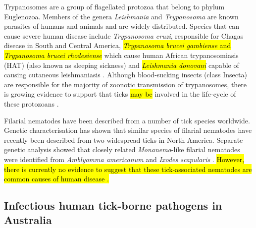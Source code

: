 \documentclass[a4paper, nobind]{templates/ociamthesis}
\begin{document}
Trypanosomes are a group of flagellated protozoa that belong to phylum Euglenozoa.
Members of the genera \emph{Leishmania} and \emph{Trypanosoma} are known parasites of humans and animals and are widely distributed.
Species that can cause severe human disease include \emph{Trypanosoma cruzi}, responsible for Chagas disease in South and Central America, \hl{\emph{Trypanosoma brucei gambiense} and \emph{Trypanosoma brucei rhodesiense}} which cause human African trypanosomiasis (HAT) (also known as sleeping sickness) and \hl{\emph{Leishmania donovani}} capable of causing cutaneous leishmaniasis \autocite{kauferReviewSystematicsSpecies2020}.
Although blood-sucking insects (class Insecta) are responsible for the majority of zoonotic transmission of trypanosomes, there is growing evidence to support that ticks \hl{may be} involved in the life-cycle of these protozoans \autocite{morzariaTransmissionTrypanosomaSp1986,thekisoeTrypanosomeSpeciesIsolated2007}.

Filarial nematodes have been described from a number of tick species worldwide.
Genetic characterisation has shown that similar species of filarial nematodes have recently been described from two widespread ticks in North America.
Separate genetic analysis showed that closely related \emph{Monanema}-like filarial nematodes were identified from \emph{Amblyomma americanum} \autocite{henningDiscoveryFilarialNematode2016} and \emph{Ixodes scapularis} \autocite{tokarzCharacterizationMonanemaNematode2020}.
\hl{However, there is currently no evidence to suggest that these tick-associated nematodes are common causes of human disease \autocite{tokarzCharacterizationMonanemaNematode2020}.}

\hypertarget{infectious-human-tick-borne-pathogens-in-australia}{%
\subsection{Infectious human tick-borne pathogens in Australia}\label{infectious-human-tick-borne-pathogens-in-australia}}
\end{document}

